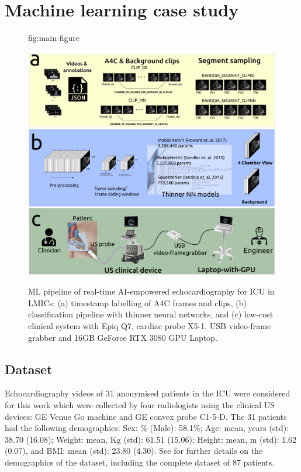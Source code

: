 \documentclass[mlabstract,twocolumn]{jmlr}
\begin{document}
\section{Machine learning case study}
\begin{figure}[ht]%
\floatconts
  {fig:main-figure}
  {\caption{
      ML pipeline of real-time AI-empowered echocardiography for ICU in LMICs:
      (a) timestamp labelling of A4C frames and clips,
      (b) classification pipeline with thinner neural networks, and
      (c) low-cost clinical system with Epiq Q7, cardiac probe X5-1, USB video-frame grabber and 16GB GeForce RTX 3080 GPU Laptop.
    }
  }
  {\includegraphics[width=0.85\linewidth]{../figures/main-figure/versions/drawing-v03}}%
\end{figure}
\subsection{Dataset}
Echocardiography videos of 31 anonymised patients in the ICU were considered for this work which were collected by four radiologists using the clinical US devices: GE Venue Go machine and GE convex probe C1-5-D.
The 31 patients had the following demographics:
Sex: \% (Male): 58.1\%;
Age: mean, years (std): 38.70 (16.08);
Weight: mean, Kg (std): 61.51 (15.06);
Height: mean, m (std): 1.62 (0.07), and 
BMI: mean (std): 23.80 (4.30).
See  for further details on the demographics of the dataset, including the complete dataset of 87 patients.
\end{document}
